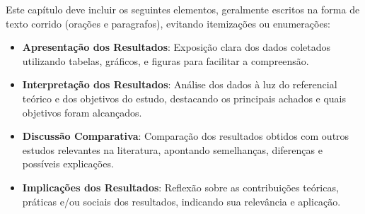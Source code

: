 


Este capítulo deve incluir os seguintes elementos, geralmente escritos na forma de texto corrido (orações e paragrafos), evitando itemizações ou enumerações:

\begin{itemize}
    \item \textbf{Apresentação dos Resultados}: Exposição clara dos dados coletados utilizando tabelas, gráficos, e figuras para facilitar a compreensão.
    \item \textbf{Interpretação dos Resultados}: Análise dos dados à luz do referencial teórico e dos objetivos do estudo, destacando os principais achados e quais objetivos foram alcançados.
    \item \textbf{Discussão Comparativa}: Comparação dos resultados obtidos com outros estudos relevantes na literatura, apontando semelhanças, diferenças e possíveis explicações.
    \item \textbf{Implicações dos Resultados}: Reflexão sobre as contribuições teóricas, práticas e/ou sociais dos resultados, indicando sua relevância e aplicação.
\end{itemize}


